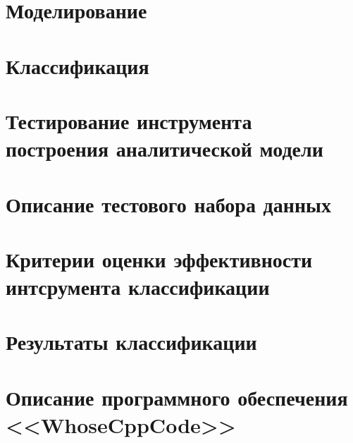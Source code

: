 \newpage  
\section{Моделирование}\label{modeling}

 
 
\newpage  
\section{Классификация}\label{classifiers}


\newpage
\section{Тестирование инструмента построения аналитической модели}\label{crossval}


\newpage 
\section{Описание тестового набора данных}\label{test_data}

\clearpage
\section{Критерии оценки эффективности интсрумента классификации}\label{eval}

\newpage
\section{Результаты классификации}


\newpage
\section{Описание программного обеспечения <<WhoseCppCode>>}


% 

 \newpage
 
 
 \newpage
 

\clearpage
{}



